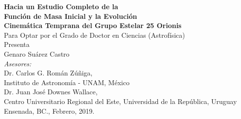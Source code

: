 \documentclass[12pt]{article}
\begin{document}
\vspace*{3mm}
\begin{center}
{\Large \textbf{Hacia un Estudio Completo de la}}\\ \vspace*{2mm}
{\Large \textbf{Funci\'on de Masa Inicial y la Evoluci\'on}}\\ \vspace*{2mm}
{\Large \textbf{Cinem\'atica Temprana del Grupo Estelar 25 Orionis}}\\
\vspace*{10mm}
{\Large Para Optar por el Grado de Doctor en Ciencias (Astrof\'isica)}\\
\vspace*{10mm}
{\Large Presenta}\\
\vspace*{5mm}
{\Large Genaro Su\'arez Castro}\\
\vspace*{10mm}
\textit{Asesores:}\\
\vspace*{3mm}
{\large Dr. Carlos G. Rom\'an Z\'u\~niga,} \\Instituto de Astronom\'ia - UNAM, M\'exico \\
\vspace*{2mm}
{\large Dr. Juan Jos\'e Downes Wallace,} \\Centro Universitario Regional del Este, Universidad de la Rep\'ublica, Uruguay \\
\vspace*{8mm}
Ensenada, BC., Febrero, 2019.
\end{center}
\end{document}
